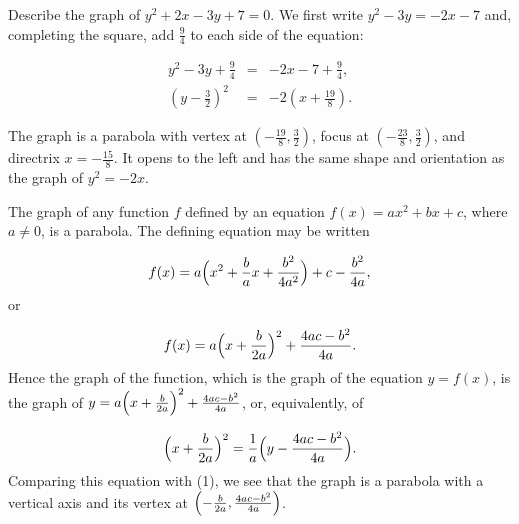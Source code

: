\begin{example}
Describe the graph of $y^2 + 2x - 3y + 7 = 0$. We first write $y^2 - 3y = - 2x - 7$ and, completing the square, add $\frac{9}{4}$ to each side of the equation: 

\begin{eqnarray*}
 y^2 - 3y + \frac{9}{4} &=& - 2x -7 + \frac{9}{4},\\
(y - \frac{3}{2})^2 &=& - 2(x + \frac{19}{8}).
\end{eqnarray*}

\noindent The graph is a parabola with vertex at $(-\frac{19}{8}, \frac{3}{2})$, focus at $( -\frac{23}{8}, \frac{3}{2})$, and directrix $x = -\frac{15}{8}$.  It opens to the left and has the same shape and orientation as the graph of $y^2 = -2x$.
\end{example}

\noindent The graph of any function $f$ defined by an equation $f(x) = ax^2 + bx + c$, where $a \neq 0$, is a parabola. The defining equation may be written

$$
f(x) = a \Bigl(x^2 + \frac{b}{a} x + \frac{b^2}{4a^2} \Bigr) + c - \frac{b^2}{4a},
$$
\noindent or

$$
f(x) = a \Bigl(x + \frac{b}{2a} \Bigr)^2 + \frac{4ac - b^2}{4a}.
$$
\noindent Hence the graph of the function, which is the graph of the equation $y = f(x)$, is the graph of $y = a \Bigl(x + \frac{b}{2a} \Bigr)^2 + \frac{4ac - b^2}{4a}$, or, equivalently, of

$$
\Bigl(x + \frac{b}{2a} \Bigr)^2 = \frac{1}{a} \Bigl(y - \frac{4ac - b^2}{4a} \Bigr).
$$
\noindent  Comparing this equation with (1), we see that the graph is a parabola with a vertical axis and its vertex at $\Bigl( -\frac{b}{2a}, \frac{4ac - b^2}{4a} \Bigr)$.
